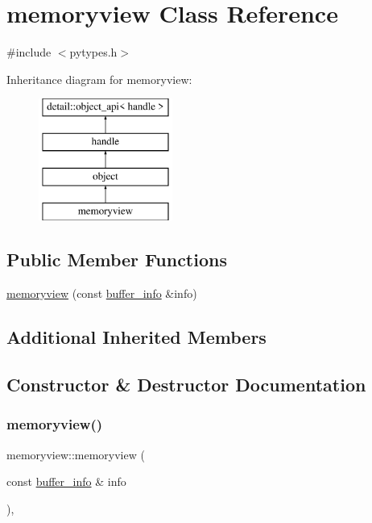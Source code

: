 \hypertarget{classmemoryview}{}\section{memoryview Class Reference}
\label{classmemoryview}


{\ttfamily \#include $<$pytypes.\+h$>$}

Inheritance diagram for memoryview\+:\begin{figure}[H]
\begin{center}
\leavevmode
\includegraphics[height=4.000000cm]{classmemoryview}
\end{center}
\end{figure}
\subsection*{Public Member Functions}
\begin{DoxyCompactItemize}
\item 
\mbox{\hyperlink{classmemoryview_a9b68f7e02bfa56bffd6dd0e00d0cc8f9}{memoryview}} (const \mbox{\hyperlink{structbuffer__info}{buffer\+\_\+info}} \&info)
\end{DoxyCompactItemize}
\subsection*{Additional Inherited Members}


\subsection{Constructor \& Destructor Documentation}
\mbox{\label{classmemoryview_a9b68f7e02bfa56bffd6dd0e00d0cc8f9}} 
\subsubsection{\texorpdfstring{memoryview()}{memoryview()}}
{\footnotesize\ttfamily memoryview\+::memoryview (\begin{DoxyParamCaption}\item[{const \mbox{\hyperlink{structbuffer__info}{buffer\+\_\+info}} \&}]{info }\end{DoxyParamCaption})\hspace{0.3cm}{\ttfamily [inline]}, {\ttfamily [explicit]}}



